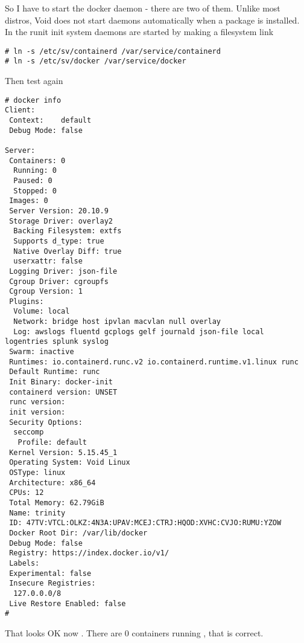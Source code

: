 \documentclass{article}  %
\begin{document}
 So I have to start the docker daemon - there are two of them. Unlike most distros, Void does not start daemons automatically when a package is installed. In the runit init system daemons are started by making a filesystem link
\begin{verbatim}
# ln -s /etc/sv/containerd /var/service/containerd
# ln -s /etc/sv/docker /var/service/docker
\end{verbatim}

Then test again
\begin{verbatim}
# docker info
Client:
 Context:    default
 Debug Mode: false

Server:
 Containers: 0
  Running: 0
  Paused: 0
  Stopped: 0
 Images: 0
 Server Version: 20.10.9
 Storage Driver: overlay2
  Backing Filesystem: extfs
  Supports d_type: true
  Native Overlay Diff: true
  userxattr: false
 Logging Driver: json-file
 Cgroup Driver: cgroupfs
 Cgroup Version: 1
 Plugins:
  Volume: local
  Network: bridge host ipvlan macvlan null overlay
  Log: awslogs fluentd gcplogs gelf journald json-file local logentries splunk syslog
 Swarm: inactive
 Runtimes: io.containerd.runc.v2 io.containerd.runtime.v1.linux runc
 Default Runtime: runc
 Init Binary: docker-init
 containerd version: UNSET
 runc version: 
 init version: 
 Security Options:
  seccomp
   Profile: default
 Kernel Version: 5.15.45_1
 Operating System: Void Linux
 OSType: linux
 Architecture: x86_64
 CPUs: 12
 Total Memory: 62.79GiB
 Name: trinity
 ID: 47TV:VTCL:OLKZ:4N3A:UPAV:MCEJ:CTRJ:HQOD:XVHC:CVJO:RUMU:YZOW
 Docker Root Dir: /var/lib/docker
 Debug Mode: false
 Registry: https://index.docker.io/v1/
 Labels:
 Experimental: false
 Insecure Registries:
  127.0.0.0/8
 Live Restore Enabled: false
#
\end{verbatim}
 That looks OK now . There are 0 containers running , that is correct.
\end{document}
